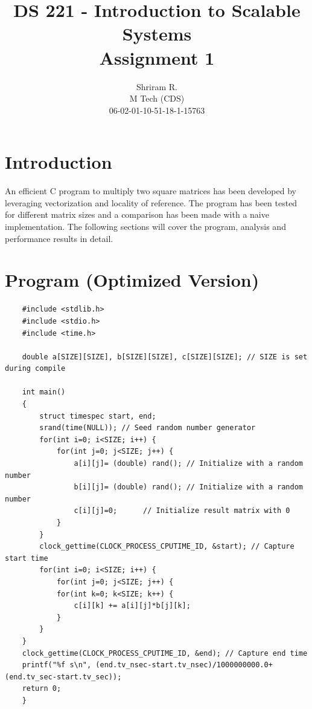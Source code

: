 \documentclass[11pt,a4paper,oneside]{article}
\begin{document}
	\title{DS 221 - Introduction to Scalable Systems \\ Assignment 1}
	\author{Shriram R. \\ M Tech (CDS) \\ 06-02-01-10-51-18-1-15763}
	\maketitle
	
	\section{Introduction}
	An efficient C program to multiply two square matrices has been developed by leveraging vectorization and locality of reference. The program has been tested for different matrix sizes and a comparison has been made with a naive implementation. The following sections will cover the program, analysis and performance results in detail.
	
	\section{Program (Optimized Version)}
	\begin{verbatim}
	#include <stdlib.h>
	#include <stdio.h>
	#include <time.h>
	
	double a[SIZE][SIZE], b[SIZE][SIZE], c[SIZE][SIZE]; // SIZE is set during compile
	
	int main()
	{
	    struct timespec start, end;
	    srand(time(NULL)); // Seed random number generator	    
	    for(int i=0; i<SIZE; i++) {
	        for(int j=0; j<SIZE; j++) {
	            a[i][j]= (double) rand(); // Initialize with a random number
	            b[i][j]= (double) rand(); // Initialize with a random number
	            c[i][j]=0;      // Initialize result matrix with 0
	        }
	    }	
	    clock_gettime(CLOCK_PROCESS_CPUTIME_ID, &start); // Capture start time	    
	    for(int i=0; i<SIZE; i++) {
	        for(int j=0; j<SIZE; j++) {
            for(int k=0; k<SIZE; k++) {
                c[i][k] += a[i][j]*b[j][k];
            }
        }
    }        
    clock_gettime(CLOCK_PROCESS_CPUTIME_ID, &end); // Capture end time        
    printf("%f s\n", (end.tv_nsec-start.tv_nsec)/1000000000.0+(end.tv_sec-start.tv_sec));
    return 0;
	}
	
	
	
	\end{verbatim}
	
\end{document}

